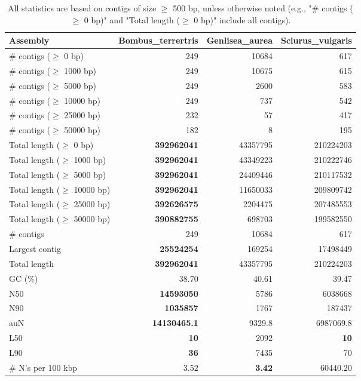 \documentclass[12pt,a4paper]{article}
\begin{document}
\begin{table}[ht]
\begin{center}
\caption{All statistics are based on contigs of size $\geq$ 500 bp, unless otherwise noted (e.g., "\# contigs ($\geq$ 0 bp)" and "Total length ($\geq$ 0 bp)" include all contigs).}
\begin{tabular}{|l*{3}{|r}|}
\hline
Assembly & Bombus\_terrertris & Genlisea\_aurea & Sciurus\_vulgaris \\ \hline
\# contigs ($\geq$ 0 bp) & 249 & 10684 & 617 \\ \hline
\# contigs ($\geq$ 1000 bp) & 249 & 10675 & 615 \\ \hline
\# contigs ($\geq$ 5000 bp) & 249 & 2600 & 583 \\ \hline
\# contigs ($\geq$ 10000 bp) & 249 & 737 & 542 \\ \hline
\# contigs ($\geq$ 25000 bp) & 232 & 57 & 417 \\ \hline
\# contigs ($\geq$ 50000 bp) & 182 & 8 & 195 \\ \hline
Total length ($\geq$ 0 bp) & {\bf 392962041} & 43357795 & 210224203 \\ \hline
Total length ($\geq$ 1000 bp) & {\bf 392962041} & 43349223 & 210222746 \\ \hline
Total length ($\geq$ 5000 bp) & {\bf 392962041} & 24409446 & 210117532 \\ \hline
Total length ($\geq$ 10000 bp) & {\bf 392962041} & 11650033 & 209809742 \\ \hline
Total length ($\geq$ 25000 bp) & {\bf 392626575} & 2204475 & 207485553 \\ \hline
Total length ($\geq$ 50000 bp) & {\bf 390882755} & 698703 & 199582550 \\ \hline
\# contigs & 249 & 10684 & 617 \\ \hline
Largest contig & {\bf 25524254} & 169254 & 17498449 \\ \hline
Total length & {\bf 392962041} & 43357795 & 210224203 \\ \hline
GC (\%) & 38.70 & 40.61 & 39.47 \\ \hline
N50 & {\bf 14593050} & 5786 & 6038668 \\ \hline
N90 & {\bf 1035857} & 1767 & 187437 \\ \hline
auN & {\bf 14130465.1} & 9329.8 & 6987069.8 \\ \hline
L50 & {\bf 10} & 2092 & {\bf 10} \\ \hline
L90 & {\bf 36} & 7435 & 70 \\ \hline
\# N's per 100 kbp & 3.52 & {\bf 3.42} & 60440.20 \\ \hline
\end{tabular}
\end{center}
\end{table}
\end{document}
